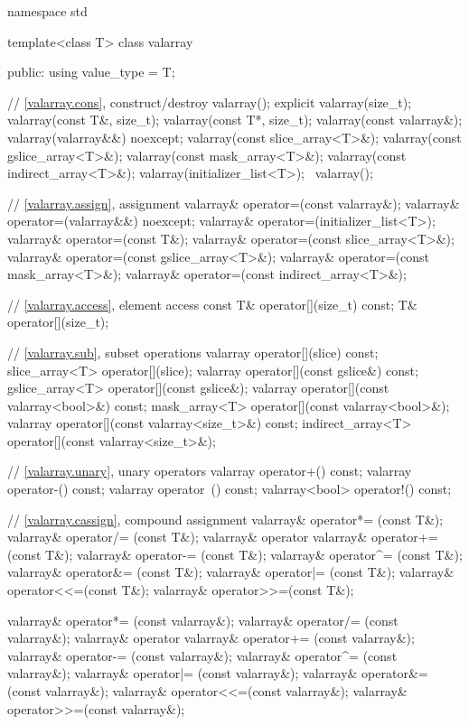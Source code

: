 %
\begin{codeblock}
namespace std {
  template<class T> class valarray {
  public:
    using value_type = T;

    // \ref{valarray.cons}, construct/destroy
    valarray();
    explicit valarray(size_t);
    valarray(const T&, size_t);
    valarray(const T*, size_t);
    valarray(const valarray&);
    valarray(valarray&&) noexcept;
    valarray(const slice_array<T>&);
    valarray(const gslice_array<T>&);
    valarray(const mask_array<T>&);
    valarray(const indirect_array<T>&);
    valarray(initializer_list<T>);
    ~valarray();

    // \ref{valarray.assign}, assignment
    valarray& operator=(const valarray&);
    valarray& operator=(valarray&&) noexcept;
    valarray& operator=(initializer_list<T>);
    valarray& operator=(const T&);
    valarray& operator=(const slice_array<T>&);
    valarray& operator=(const gslice_array<T>&);
    valarray& operator=(const mask_array<T>&);
    valarray& operator=(const indirect_array<T>&);

    // \ref{valarray.access}, element access
    const T&          operator[](size_t) const;
    T&                operator[](size_t);

    // \ref{valarray.sub}, subset operations
    valarray          operator[](slice) const;
    slice_array<T>    operator[](slice);
    valarray          operator[](const gslice&) const;
    gslice_array<T>   operator[](const gslice&);
    valarray          operator[](const valarray<bool>&) const;
    mask_array<T>     operator[](const valarray<bool>&);
    valarray          operator[](const valarray<size_t>&) const;
    indirect_array<T> operator[](const valarray<size_t>&);

    // \ref{valarray.unary}, unary operators
    valarray operator+() const;
    valarray operator-() const;
    valarray operator~() const;
    valarray<bool> operator!() const;

    // \ref{valarray.cassign}, compound assignment
    valarray& operator*= (const T&);
    valarray& operator/= (const T&);
    valarray& operator%
    valarray& operator+= (const T&);
    valarray& operator-= (const T&);
    valarray& operator^= (const T&);
    valarray& operator&= (const T&);
    valarray& operator|= (const T&);
    valarray& operator<<=(const T&);
    valarray& operator>>=(const T&);

    valarray& operator*= (const valarray&);
    valarray& operator/= (const valarray&);
    valarray& operator%
    valarray& operator+= (const valarray&);
    valarray& operator-= (const valarray&);
    valarray& operator^= (const valarray&);
    valarray& operator|= (const valarray&);
    valarray& operator&= (const valarray&);
    valarray& operator<<=(const valarray&);
    valarray& operator>>=(const valarray&);

}}
\end{codeblock}

